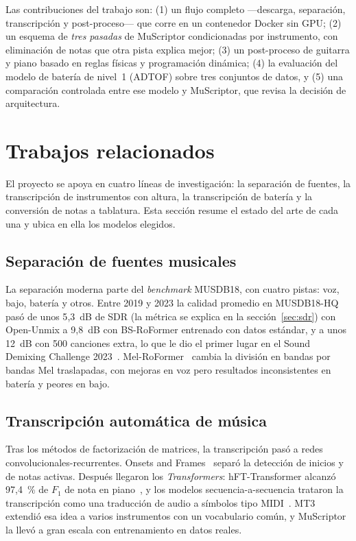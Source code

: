 \documentclass[11pt,a4paper]{article}
\begin{document}
Las contribuciones del trabajo son: (1) un flujo completo ---descarga, separación, transcripción y
post-proceso--- que corre en un contenedor Docker sin GPU; (2) un esquema de \emph{tres pasadas} de
MuScriptor condicionadas por instrumento, con eliminación de notas que otra pista explica mejor;
(3) un post-proceso de guitarra y piano basado en reglas físicas y programación dinámica; (4) la
evaluación del modelo de batería de nivel~1 (ADTOF) sobre tres conjuntos de datos, y (5) una
comparación controlada entre ese modelo y MuScriptor, que revisa la decisión de arquitectura.

\section{Trabajos relacionados}

El proyecto se apoya en cuatro líneas de investigación: la separación de fuentes, la transcripción de
instrumentos con altura, la transcripción de batería y la conversión de notas a tablatura. Esta sección
resume el estado del arte de cada una y ubica en ella los modelos elegidos.

\subsection{Separación de fuentes musicales}
La separación moderna parte del \emph{benchmark} MUSDB18, con cuatro pistas: voz, bajo, batería y
otros. Entre 2019 y 2023 la calidad promedio en MUSDB18-HQ pasó de unos 5{,}3~dB de SDR (la métrica se
explica en la sección~\ref{sec:sdr}) con Open-Unmix a 9{,}8~dB con BS-RoFormer entrenado con datos
estándar, y a unos 12~dB con 500 canciones extra, lo que le dio el primer lugar en el Sound Demixing
Challenge 2023~\cite{lu2023bsroformer}. Mel-RoFormer~\cite{wang2023melroformer} cambia la división en
bandas por bandas Mel traslapadas, con mejoras en voz pero resultados inconsistentes en batería y
peores en bajo.

\subsection{Transcripción automática de música}
Tras los métodos de factorización de matrices, la transcripción pasó a redes
convolucionales-recurrentes. Onsets and Frames~\cite{hawthorne2018onsets} separó la detección de
inicios y de notas activas. Después llegaron los \emph{Transformers}: hFT-Transformer alcanzó 97{,}4~\% de
$F_1$ de nota en piano~\cite{toyama2023hft}, y los modelos secuencia-a-secuencia trataron la
transcripción como una traducción de audio a símbolos tipo MIDI~\cite{hawthorne2021seq2seq}.
MT3~\cite{gardner2022mt3} extendió esa idea a varios instrumentos con un vocabulario común, y
MuScriptor~\cite{rouard2026muscriptor} la llevó a gran escala con entrenamiento en datos reales.
\end{document}
